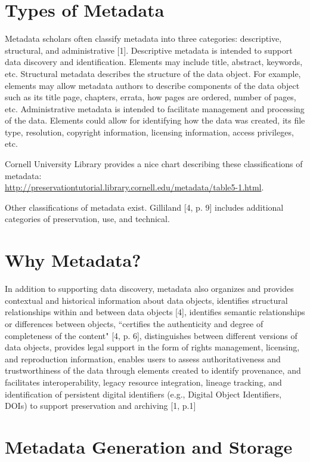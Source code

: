 \documentclass[10pt,oneside]{memoir}
\begin{document}
\section{Types of Metadata}

Metadata scholars often classify metadata into three categories: descriptive, structural, and administrative [1].
Descriptive metadata is intended to support data discovery and identification. Elements may include title, abstract, keywords, etc.
Structural metadata describes the structure of the data object. For example, elements may allow metadata authors to describe components of the data object such as its title page, chapters, errata, how pages are ordered, number of pages, etc.
Administrative metadata is intended to facilitate management and processing of the data.
Elements could allow for identifying how the data was created, its file type, resolution, copyright information, licensing information, access privileges, etc.

Cornell University Library provides a nice chart describing these classifications of metadata: \\ \url{http://preservationtutorial.library.cornell.edu/metadata/table5-1.html}.

Other classifications of metadata exist. Gilliland [4, p. 9] includes additional categories of preservation, use, and technical.

\section{Why Metadata?}

In addition to supporting data discovery, metadata also organizes and provides contextual and historical information about data objects, identifies structural relationships within and between data objects [4], identifies semantic relationships or differences between objects, ``certifies the authenticity and degree of completeness of the content" [4, p. 6], distinguishes between different versions of data objects, provides legal support in the form of rights management, licensing, and reproduction information, enables users to assess authoritativeness and trustworthiness of the data through elements created to identify provenance, and facilitates interoperability, legacy resource integration, lineage tracking, and identification of persistent digital identifiers (e.g., Digital Object Identifiers, DOIs) to support preservation and archiving [1, p.1]

\section{Metadata Generation and Storage}
\end{document}
